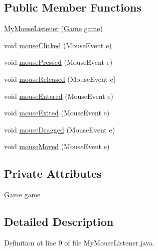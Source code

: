 \subsection*{Public Member Functions}
\begin{DoxyCompactItemize}
\item 
\hyperlink{classinputs_1_1_my_mouse_listener_a74ee2eafd2cb2c8f365a69b51a2004f6}{My\+Mouse\+Listener} (\hyperlink{classprogetto_1_1_game}{Game} \hyperlink{classinputs_1_1_my_mouse_listener_ac6a5ed6191fcf3a5bf0445921feb4f48}{game})
\item 
void \hyperlink{classinputs_1_1_my_mouse_listener_a45d56bd84238e8b56589dfc732e2b2cf}{mouse\+Clicked} (Mouse\+Event e)
\item 
void \hyperlink{classinputs_1_1_my_mouse_listener_aed82e1ce3dd3cf283d508c3ba3be70ef}{mouse\+Pressed} (Mouse\+Event e)
\item 
void \hyperlink{classinputs_1_1_my_mouse_listener_a87a07291794e15052db67f945d90853e}{mouse\+Released} (Mouse\+Event e)
\item 
void \hyperlink{classinputs_1_1_my_mouse_listener_a74e5095765312765f33ed268095a2cb2}{mouse\+Entered} (Mouse\+Event e)
\item 
void \hyperlink{classinputs_1_1_my_mouse_listener_aa14a60f36cdd6abc1d90ce56d39218eb}{mouse\+Exited} (Mouse\+Event e)
\item 
void \hyperlink{classinputs_1_1_my_mouse_listener_adbfc0588c017133c9b7070474402b72f}{mouse\+Dragged} (Mouse\+Event e)
\item 
void \hyperlink{classinputs_1_1_my_mouse_listener_a2ca251710b65639ec80bc141edde60aa}{mouse\+Moved} (Mouse\+Event e)
\end{DoxyCompactItemize}
\subsection*{Private Attributes}
\begin{DoxyCompactItemize}
\item 
\hyperlink{classprogetto_1_1_game}{Game} \hyperlink{classinputs_1_1_my_mouse_listener_ac6a5ed6191fcf3a5bf0445921feb4f48}{game}
\end{DoxyCompactItemize}


\subsection{Detailed Description}


Definition at line 9 of file My\+Mouse\+Listener.\+java.



